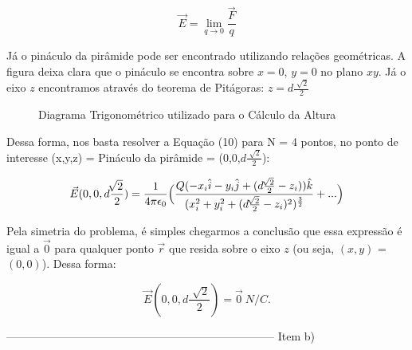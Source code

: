 \documentclass[journal,comsoc]{IEEEtran}
\begin{document}
\begin{equation}
\vec{E} = \lim_{q\to 0} \frac{\vec{F}}{q}
\end{equation}

\par Já o pináculo da pirâmide pode ser encontrado utilizando relações geométricas. A figura deixa clara que o pináculo se encontra sobre $x=0$, $y=0$ no plano $xy$. Já o eixo $z$ encontramos através do teorema de Pitágoras: $z=d\frac{\sqrt[]{2}}{2}$

\begin{figure}
\centering
{}
\caption{Diagrama Trigonométrico utilizado para o Cálculo da Altura}
\end{figure}

Dessa forma, nos basta resolver a Equação (10) para N = 4 pontos, no ponto de interesse (x,y,z) = Pináculo da pirâmide = (0,0,$d\frac{\sqrt[]{2}}{2}$):

\begin{equation}
    	\vec{E}(0,0,d\frac{\sqrt[]{2}}{2}) = \frac{1}{4\pi{\epsilon}_{0}}
        \Big(
        \frac
        {Q(-{x}_{i}\hat{i}-{y}_{i}\hat{j}+(d\frac{\sqrt[]{2}}{2}-{z}_{i}))\hat{k}} 
        {({x}_{i}^2+{y}_{i}^2+(d\frac{\sqrt[]{2}}{2}-{z}_{i})^2)^\frac{3}{2}}
        +
		...\space
        \Big)
\end{equation}

\par Pela simetria do problema, é simples chegarmos a conclusão que essa expressão é igual a $\vec{0}$ para qualquer ponto $\vec{r}$ que resida sobre o eixo $z$ (ou seja, $(x,y)$ = $(0,0)$). Dessa forma:

\begin{equation}
    	\vec{E}(0,0,d\frac{\sqrt[]{2}}{2}) = \vec{0}\ N/C.
\end{equation}

------------------------------------------------------------------------
Item b)
\end{document}
